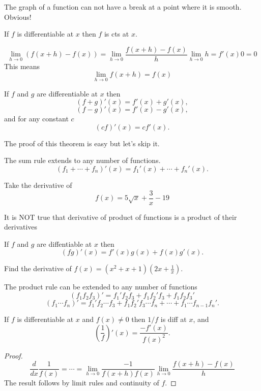 \documentclass[../main.tex]{subfiles}
\begin{document}
The graph of a function can not have a break at a point where it is smooth. Obvious!
\begin{theorem}
    If $f$ is differentiable at $x$ then $f$ is cts at $x$.
\end{theorem}

\begin{theorem}
    \[
        \lim_{h \to 0} (f(x+h) - f(x)) =
        \lim_{h \to 0} \dfrac{f(x+h) - f(x)}{h}
        \lim_{h \to 0} h = f'(x) 0 = 0
    \]
    This means
    \[
        \lim_{h \to 0} f(x+h)=f(x)
    \]
\end{theorem}

\begin{theorem}
    If $f$ and $g$ are differentiable at $x$ then
    \[
        (f+g)'(x) = f'(x) + g'(x),
    \]
    \[
        (f-g)'(x) = f'(x) - g'(x),
    \]
    and for any constant $c$
    \[
        (c f)'(x) = c f'(x).
    \]
\end{theorem}
The proof of this theorem is easy but let's skip it.

The sum rule extends to any number of functions.
\[
    (f_1 + \cdots + f_n)'(x) = f_1'(x) + \cdots + f_n'(x).
\]

\begin{example}
    Take the derivative of
    \[
        f(x) = 5 \sqrt{x} + \frac{3}{x} - 19
    \]
\end{example}

It is NOT true that derivative of product of functions is a product of their derivatives
\begin{theorem}
    If $f$ and $g$ are diffentiable at $x$ then
    \[
        (f g)'(x) = f'(x) g(x) + f(x) g'(x).
    \]
\end{theorem}

\begin{example}
    Find the derivative of $f(x) = (x^2+x+1)(2x + \frac{1}{x})$.
\end{example}

The product rule can be extended to any number of functions
\[
    (f_1 f_2 f_3)' = f_1' f_2 f_3 + f_1 f_2' f_3  + f_1 f_2 f_3'
\]
\[
    (f_1 \cdots f_n)' = f_1' f_2 \cdots f_3 + f_1 f_2' f_3 \cdots f_n + \cdots + f_1 \cdots f_{n-1} f_n'.
\]

\begin{theorem}
    If $f$ is differentiable at $x$ and $f(x) \neq 0$ then $1/f$ is diff at $x$, and
    \[
        \left(\dfrac{1}{f} \right)'(x) = \dfrac{-f'(x)}{f(x)^2}.
    \]
\end{theorem}
\begin{proof}
\[
    \dfrac{d}{dx} \dfrac{1}{f(x)} = \cdots = \lim_{h \to 0} \dfrac{-1}{f(x+h) f(x)} \lim_{h \to 0} \dfrac{f(x+h)-f(x)}{h}
\]
The result follows by limit rules and continuity of $f$.
\end{proof}
\end{document}
